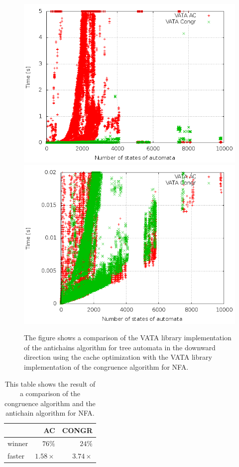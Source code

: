 \begin{figure}
\begin{center}
\includegraphics[scale=0.33]{fig/plot_ca_zprava.png}
\includegraphics[scale=0.33]{fig/plot_ca_step_zprava.png}
\caption{The figure shows a
 comparison of the VATA library implementation of the antichains algorithm for tree automata in the downward direction using the cache optimization 
 with the VATA library implementation of the congruence algorithm for NFA.}
\label{fig:figPlotCa}
\end{center}
\end{figure}

\begin{table}
\begin{center}
\parbox{.45\linewidth}{
  \begin{tabular}[scale=0.3]{ | l | r | r |}
   \hline
    & \textbf{AC} & \textbf{CONGR} \\ \hline \hline
    winner & $76\%$ & $24\%$ \\ \hline
    faster & $1.58\times$ & $3.74\times$ \\ \hline
   \end{tabular}
}
   \caption{This table shows the result of a comparison of the congruence algorithm and the antichain algorithm for NFA.}
   \label{tabNFA}
\end{center}
\end{table}

